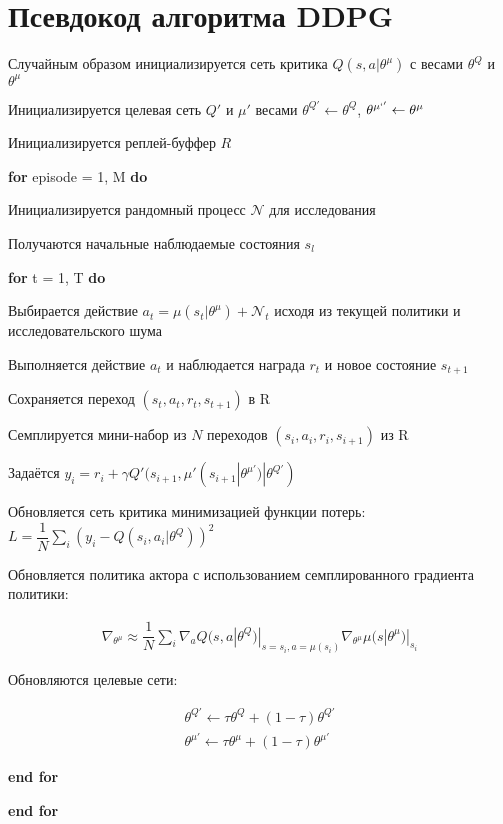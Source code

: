 \chapter{Псевдокод алгоритма DDPG}\label{appendix-ddpg-alg}                            %

\setlength{\parindent}{0em}

Случайным образом инициализируется сеть критика $Q(s, a|\theta^\mu)$ с весами $\theta^Q$ и $\theta^\mu$

Инициализируется целевая сеть $Q'$ и $\mu'$ весами $\theta^{Q'} \leftarrow \theta^Q$, $\theta^{\mu`'} \leftarrow \theta^\mu$

Инициализируется реплей-буффер $R$

\textbf{for} episode = 1, M \textbf{do}

\setlength{\parindent}{1em}

Инициализируется рандомный процесс $\mathcal{N}$ для исследования

Получаются начальные наблюдаемые состояния $s_l$

\textbf{for} t = 1, T \textbf{do}

\setlength{\parindent}{2em}

Выбирается действие $a_t = \mu (s_t | \theta^\mu) + \mathcal{N}_t$ исходя из текущей политики и исследовательского шума

Выполняется действие $a_t$ и наблюдается награда $r_t$ и новое состояние $s_{t+1}$

Сохраняется переход $(s_t, a_t, r_t, s_{t+1})$ в R

Семплируется мини-набор из $N$ переходов $(s_i, a_i, r_i, s_{i+1})$ из R

Задаётся $y_i = r_i + \gamma Q' (s_{i+1}, \mu' (s_{i+1} | \theta^{\mu'})| \theta^{Q'})$

Обновляется сеть критика минимизацией функции потерь: $L = \dfrac{1}{N} \sum_{i} (y_i - Q(s_i, a_i | \theta^Q))^2$

Обновляется политика актора с использованием семплированного градиента политики:

\begin{equation}
    \begin{multlined}
        \nabla_{\theta^\mu} \approx \dfrac{1}{N} \sum_{i} \nabla_a Q(s, a | \theta^Q) | _{s=s_i, a=\mu(s_i)} \nabla_{\theta^\mu} \mu (s | \theta^\mu) | _{s_i}
    \end{multlined}
\end{equation}

Обновляются целевые сети:

\begin{equation}
    \begin{multlined}
        \theta^{Q'} \leftarrow \tau \theta^Q + (1 - \tau) \theta^{Q'} \\
        \theta^{\mu'} \leftarrow \tau \theta^\mu + (1 - \tau) \theta^{\mu'}
    \end{multlined}
\end{equation}

\setlength{\parindent}{1em}

\textbf{end for}

\setlength{\parindent}{0em}

\textbf{end for}

\setlength{\parindent}{2.5em}

